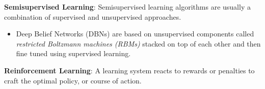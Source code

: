 \documentclass[11pt, a4paper]{article}
\begin{document}
\noindent
\textbf{Semisupervised Learning}: Semisupervised learning algorithms are usually a combination of supervised and unsupervised approaches. 
\begin{itemize}
	\item Deep Belief Networks (DBNs) are based on unsupervised 			components called \textsl{restricted Boltzmann machines 			(RBMs)} stacked on top of each other and then fine tuned 			using supervised learning. 
\end{itemize}

\noindent
\textbf{Reinforcement Learning}: A learning system reacts to rewards or penalties to craft the optimal policy, or course of action. 
\end{document}
